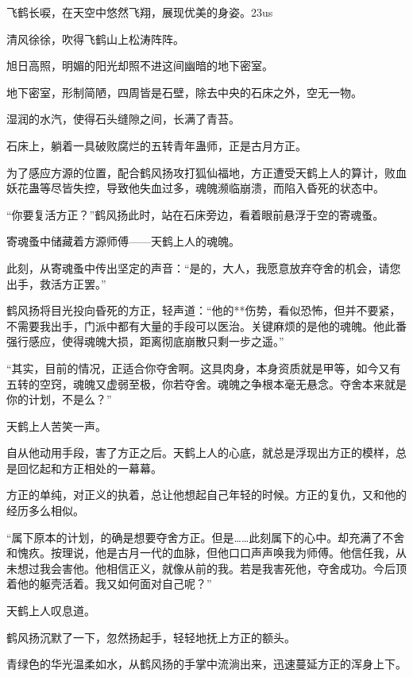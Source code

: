 
\begin{this_body}

飞鹤长唳，在天空中悠然飞翔，展现优美的身姿。23us

清风徐徐，吹得飞鹤山上松涛阵阵。

旭日高照，明媚的阳光却照不进这间幽暗的地下密室。

地下密室，形制简陋，四周皆是石壁，除去中央的石床之外，空无一物。

湿润的水汽，使得石头缝隙之间，长满了青苔。

石床上，躺着一具破败腐烂的五转青年蛊师，正是古月方正。

为了感应方源的位置，配合鹤风扬攻打狐仙福地，方正遭受天鹤上人的算计，败血妖花蛊等尽皆失控，导致他失血过多，魂魄濒临崩溃，而陷入昏死的状态中。

“你要复活方正？”鹤风扬此时，站在石床旁边，看着眼前悬浮于空的寄魂蚤。

寄魂蚤中储藏着方源师傅——天鹤上人的魂魄。

此刻，从寄魂蚤中传出坚定的声音：“是的，大人，我愿意放弃夺舍的机会，请您出手，救活方正罢。”

鹤风扬将目光投向昏死的方正，轻声道：“他的**伤势，看似恐怖，但并不要紧，不需要我出手，门派中都有大量的手段可以医治。关键麻烦的是他的魂魄。他此番强行感应，使得魂魄大损，距离彻底崩散只剩一步之遥。”

“其实，目前的情况，正适合你夺舍啊。这具肉身，本身资质就是甲等，如今又有五转的空窍，魂魄又虚弱至极，你若夺舍。魂魄之争根本毫无悬念。夺舍本来就是你的计划，不是么？”

天鹤上人苦笑一声。

自从他动用手段，害了方正之后。天鹤上人的心底，就总是浮现出方正的模样，总是回忆起和方正相处的一幕幕。

方正的单纯，对正义的执着，总让他想起自己年轻的时候。方正的复仇，又和他的经历多么相似。

“属下原本的计划，的确是想要夺舍方正。但是……此刻属下的心中。却充满了不舍和愧疚。按理说，他是古月一代的血脉，但他口口声声唤我为师傅。他信任我，从未想过我会害他。他相信正义，就像从前的我。若是我害死他，夺舍成功。今后顶着他的躯壳活着。我又如何面对自己呢？”

天鹤上人叹息道。

鹤风扬沉默了一下，忽然扬起手，轻轻地抚上方正的额头。

青绿色的华光温柔如水，从鹤风扬的手掌中流淌出来，迅速蔓延方正的浑身上下。


\end{this_body}
